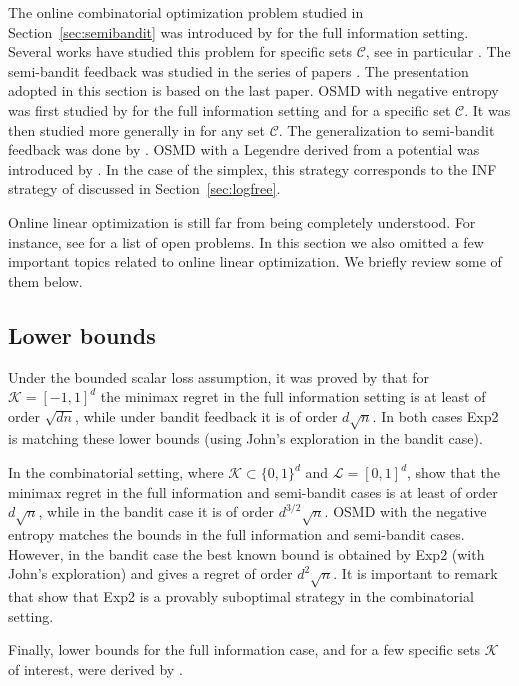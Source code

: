 \documentclass[11pt]{hackednow}
\newcommand{\cL}{\mathcal{L}}
\newcommand{\cC}{\mathcal{C}}
\newcommand{\cK}{\mathcal{K}}
\begin{document}
The online combinatorial optimization problem studied in Section~\ref{sec:semibandit} was introduced by \cite{KV05} for the full information setting. Several works have studied this problem for specific sets $\cC$, see in particular \cite{TW03, WK08, HW09, HKW10, KWK10, WKH11, CL11}. The semi-bandit feedback was studied in the series of papers \cite{GLLO07, KRS10, UNK10, ABL11}. The presentation adopted in this section is based on the last paper. OSMD with negative entropy was first studied by \cite{HW09} for the full information setting and for a specific set $\cC$. It was then studied more generally in \cite{KWK10} for any set $\cC$. The generalization to semi-bandit feedback was done by \cite{ABL11}. OSMD with a Legendre derived from a potential was introduced by \cite{ABL11}. In the case of the simplex, this strategy corresponds to the INF strategy of \cite{AB09} discussed in Section~\ref{sec:logfree}.

Online linear optimization is still far from being completely understood. For instance, see \cite[Chapter 9]{Bub11} for a list of open problems. In this section we also omitted a few important topics related to online linear optimization. We briefly review some of them below.

\subsection{Lower bounds}
Under the bounded scalar loss assumption, it was proved by \cite{DHK08} that for $\cK=[-1,1]^d$ the minimax regret in the full information setting is at least of order $\sqrt{d n}$, while under bandit feedback it is of order $d \sqrt{n}$. In both cases Exp2 is matching these lower bounds (using John's exploration in the bandit case). 

In the combinatorial setting, where $\cK \subset \{0,1\}^d$ and $\cL = [0,1]^d$, \cite{ABL11} show that the minimax regret in the full information and semi-bandit cases is at least of order $d \sqrt{n}$, while in the bandit case it is of order $d^{3/2} \sqrt{n}$. OSMD with the negative entropy matches the bounds in the full information and semi-bandit cases. However, in the bandit case the best known bound is obtained by Exp2 (with John's exploration) and gives a regret of order $d^2 \sqrt{n}$. It is important to remark that \cite{ABL11} show that Exp2 is a provably suboptimal strategy in the combinatorial setting.

Finally, lower bounds for the full information case, and for a few specific sets $\cK$ of interest, were derived by \cite{KWK10}.
\end{document}
